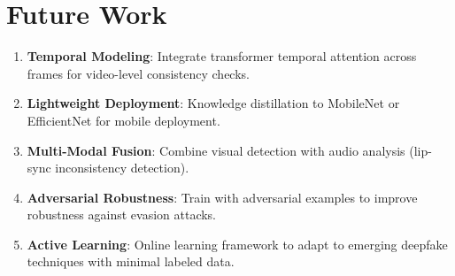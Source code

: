 \documentclass[11pt,a4paper]{article}
\begin{document}
\section{Future Work}

\begin{enumerate}
    \item \textbf{Temporal Modeling}: Integrate transformer temporal attention across frames for video-level consistency checks.
    
    \item \textbf{Lightweight Deployment}: Knowledge distillation to MobileNet or EfficientNet for mobile deployment.
    
    \item \textbf{Multi-Modal Fusion}: Combine visual detection with audio analysis (lip-sync inconsistency detection).
    
    \item \textbf{Adversarial Robustness}: Train with adversarial examples to improve robustness against evasion attacks.
    
    \item \textbf{Active Learning}: Online learning framework to adapt to emerging deepfake techniques with minimal labeled data.
\end{enumerate}
\end{document}
